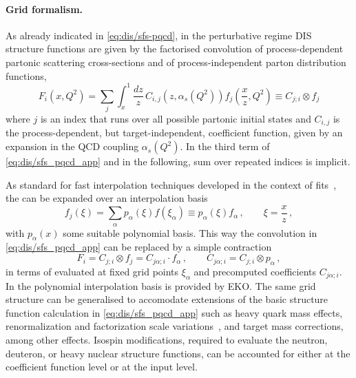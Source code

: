 \paragraph{Grid formalism.}
%
As already indicated in \cref{eq:dis/sfs-pqcd}, in the perturbative regime DIS
structure functions are given by the factorised convolution of
process-dependent partonic scattering cross-sections and of process-independent
parton distribution functions,
\begin{equation}
F_i(x,Q^2) = \sum_{j}\int_x^1 \frac{dz}{z}\, C_{i,j}(z,\alpha_s(Q^2))f_j\left( \frac{x}{z},Q^2\right) \equiv
C_{j; i} \otimes f_j
\label{eq:dis/sfs_pqcd_app}
 \end{equation}
 where $j$ is an index that runs over all possible partonic initial states and
 $C_{i,j}$ is the process-dependent, but target-independent, coefficient
 function, given by an expansion in the QCD coupling $\alpha_s(Q^2)$.
 In the third term of \cref{eq:dis/sfs_pqcd_app} and in the following, sum
 over repeated indices is implicit.
 
As standard for fast interpolation techniques developed in the context of \pdf{}
fits~\cite{Carli:2010rw,Carrazza:2020gss,Wobisch:2011ij,Bertone:2014zva}, the
\pdfs can be expanded over an interpolation basis \begin{equation}
f_j(\xi) = \sum_\alpha p_\alpha(\xi) f(\xi_\alpha) \equiv p_\alpha(\xi) f_\alpha \, ,
\qquad \xi = \frac x z \, ,
\end{equation}
with $p_\alpha(x)$ some suitable polynomial basis.
%
This way the convolution in \cref{eq:dis/sfs_pqcd_app} can be replaced by a
simple contraction
\begin{equation}
  F_i = C_{j; i} \otimes f_j = C_{j \alpha; i} \cdot f_\alpha \, ,\qquad
  C_{j \alpha; i} = C_{j; i} \otimes p_\alpha \, ,
  \label{eq:dis/grid_formalism}
\end{equation}
in terms of \pdfs evaluated at fixed grid points $\xi_\alpha$ and precomputed
coefficients $C_{j \alpha; i}$.
%
In \yadism the polynomial interpolation basis is  provided by \textsc{\small
EKO}.
%
The same grid structure can be generalised to accomodate extensions of the
basic structure function calculation in \cref{eq:dis/sfs_pqcd_app} such as
heavy quark mass effects, renormalization and factorization scale
variations~\cite{NNPDF:2019vjt,NNPDF:2019ubu}, and target mass corrections,
among other effects.
%
Isospin modifications, required to evaluate the neutron, deuteron, or heavy
nuclear structure functions, can be accounted for either at the coefficient
function level or at the input \pdf{} level.

